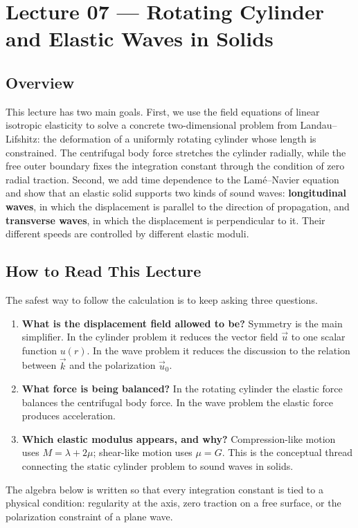 \documentclass[../main.tex]{subfiles}
\begin{document}
\section{Lecture 07 — Rotating Cylinder and Elastic Waves in Solids}\label{sec:lec07}
\date{April 29, 2026}

\subsection*{Overview}
This lecture has two main goals. First, we use the field equations of linear isotropic elasticity to solve a concrete two-dimensional problem from Landau--Lifshitz: the deformation of a uniformly rotating cylinder whose length is constrained. The centrifugal body force stretches the cylinder radially, while the free outer boundary fixes the integration constant through the condition of zero radial traction. Second, we add time dependence to the Lamé--Navier equation and show that an elastic solid supports two kinds of sound waves: \textbf{longitudinal waves}, in which the displacement is parallel to the direction of propagation, and \textbf{transverse waves}, in which the displacement is perpendicular to it. Their different speeds are controlled by different elastic moduli.

\subsection*{How to Read This Lecture}
The safest way to follow the calculation is to keep asking three questions.
\begin{enumerate}
    \item \textbf{What is the displacement field allowed to be?} Symmetry is the main simplifier. In the cylinder problem it reduces the vector field $\vec{u}$ to one scalar function $u(r)$. In the wave problem it reduces the discussion to the relation between $\vec{k}$ and the polarization $\vec{u}_0$.
    \item \textbf{What force is being balanced?} In the rotating cylinder the elastic force balances the centrifugal body force. In the wave problem the elastic force produces acceleration.
    \item \textbf{Which elastic modulus appears, and why?} Compression-like motion uses $M=\lambda+2\mu$; shear-like motion uses $\mu=G$. This is the conceptual thread connecting the static cylinder problem to sound waves in solids.
\end{enumerate}
The algebra below is written so that every integration constant is tied to a physical condition: regularity at the axis, zero traction on a free surface, or the polarization constraint of a plane wave.
\end{document}
